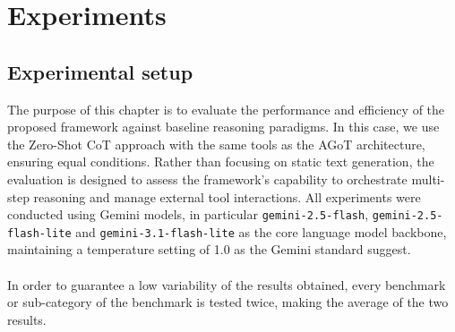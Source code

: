\documentclass[12pt,a4paper,openright,twoside]{book}
\begin{document}
\chapter{Experiments}
\label{chap:experiments}
\section{Experimental setup}
The purpose of this chapter is to evaluate the performance and efficiency of the proposed framework against baseline reasoning paradigms. In this case, we use the Zero-Shot \ac{CoT} approach with the same tools as the \ac{AGoT} architecture, ensuring equal conditions. Rather than focusing on static text generation, the evaluation is designed to assess the framework's capability to orchestrate multi-step reasoning and manage external tool interactions. 
All experiments were conducted using Gemini models, in particular \texttt{gemini-2.5-flash}, \texttt{gemini-2.5-flash-lite} and \texttt{gemini-3.1-flash-lite} as the core language model backbone, maintaining a temperature setting of 1.0 as the Gemini standard suggest.
\\\\
In order to guarantee a low variability of the results obtained, every benchmark or sub-category of the benchmark is tested twice, making the average of the two results.
\end{document}
